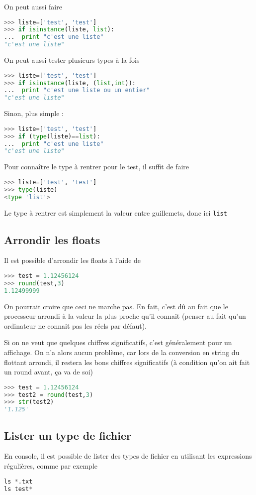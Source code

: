 \documentclass[a4paper,twoside]{article}
\begin{document}
On peut aussi faire
\begin{lstlisting}[language=python]
>>> liste=['test', 'test']
>>> if isinstance(liste, list):
...  print "c'est une liste"
"c'est une liste"
\end{lstlisting}

On peut aussi tester plusieurs types à la fois
\begin{lstlisting}[language=python]
>>> liste=['test', 'test']
>>> if isinstance(liste, (list,int)):
...  print "c'est une liste ou un entier"
"c'est une liste"
\end{lstlisting}

Sinon, plus simple :
\begin{lstlisting}[language=python]
>>> liste=['test', 'test']
>>> if (type(liste)==list):
...  print "c'est une liste"
"c'est une liste"
\end{lstlisting}

Pour connaître le type à rentrer pour le test, il suffit de faire
\begin{lstlisting}[language=python]
>>> liste=['test', 'test']
>>> type(liste)
<type 'list'>
\end{lstlisting}
Le type à rentrer est simplement la valeur entre guillemets, donc ici \texttt{list}

\subsection{Arrondir les floats}
Il est possible d'arrondir les floats à l'aide de
\begin{lstlisting}[language=python]
>>> test = 1.12456124
>>> round(test,3)
1.12499999
\end{lstlisting}

On pourrait croire que ceci ne marche pas. En fait, c'est dû au fait que le processeur arrondi à la valeur la plus proche qu'il connait (penser au fait qu'un ordinateur ne connait pas les réels par défaut).

Si on ne veut que quelques chiffres significatifs, c'est généralement pour un affichage. On n'a alors aucun problème, car lors de la conversion en string du flottant arrondi, il restera les bons chiffres significatifs (à condition qu'on ait fait un round avant, ça va de soi)
\begin{lstlisting}[language=python]
>>> test = 1.12456124
>>> test2 = round(test,3)
>>> str(test2)
'1.125'
\end{lstlisting}

\subsection{Lister un type de fichier}
En console, il est possible de lister des types de fichier en utilisant les expressions régulières, comme par exemple
\begin{lstlisting}[language=python]
ls *.txt
ls test*
\end{lstlisting}
\end{document}
